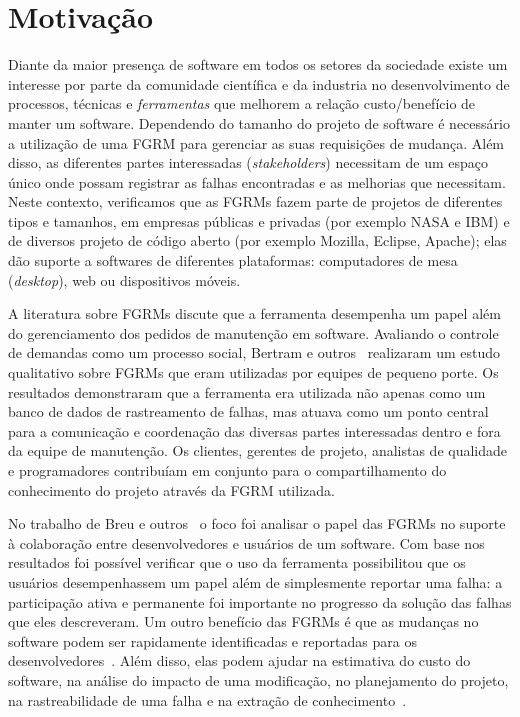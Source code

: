 \section{Motivação}
\label{sec:intro-motivacao}

Diante da maior presença de software em todos os setores da sociedade existe um
interesse por parte da comunidade científica e da industria no desenvolvimento
de processos, técnicas e \textit{ferramentas} que melhorem a relação
custo/benefício de manter um software. Dependendo do tamanho do projeto de
software é necessário a utilização de uma FGRM para gerenciar as suas
requisições de mudança. Além disso, as diferentes partes interessadas
(\textit{stakeholders}) necessitam de um espaço único onde possam registrar as
falhas encontradas e as melhorias que necessitam. Neste contexto, verificamos
que as FGRMs fazem parte de projetos de diferentes tipos e tamanhos, em
empresas públicas e privadas (por exemplo NASA e IBM) e de diversos projeto de
código aberto (por exemplo Mozilla, Eclipse, Apache); elas dão suporte a
softwares de diferentes plataformas: computadores de mesa (\textit{desktop}),
web ou dispositivos móveis.

A literatura sobre FGRMs discute que a ferramenta desempenha um papel além do
gerenciamento dos pedidos de manutenção em software. Avaliando o controle de
demandas como um processo social, Bertram e
outros~\cite{Bertram:2010:CCB:1718918.1718972} realizaram um estudo qualitativo
sobre FGRMs que eram utilizadas por equipes de pequeno porte. Os resultados
demonstraram que a ferramenta era utilizada não apenas como um banco de dados de
rastreamento de falhas, mas atuava como um ponto central para a comunicação e
coordenação das diversas partes interessadas dentro e fora da equipe de
manutenção. Os clientes, gerentes de projeto, analistas de qualidade e
programadores contribuíam em conjunto para o compartilhamento do conhecimento do
projeto através da FGRM utilizada.

No trabalho de Breu e outros~\cite{breu2010information} o foco foi
analisar o papel das FGRMs no suporte à colaboração entre desenvolvedores e
usuários de um software. Com base nos resultados foi possível verificar que o
uso da ferramenta possibilitou que os usuários desempenhassem um papel além de
simplesmente reportar uma falha: a participação ativa e permanente foi
importante no progresso da solução das falhas que eles descreveram. Um outro
benefício das FGRMs é que as mudanças no software podem ser rapidamente
identificadas e reportadas para os desenvolvedores~\cite{anvik2005coping}. Além
disso, elas podem ajudar na estimativa do custo do software, na análise do
impacto de uma modificação, no planejamento do projeto, na rastreabilidade de
uma falha e na extração de conhecimento~\cite{cavalcanti2013bug}.

